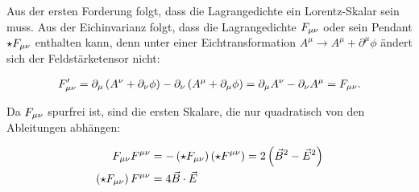 Aus der ersten Forderung folgt, dass die Lagrangedichte ein Lorentz-Skalar sein muss. Aus der Eichinvarianz folgt, dass die Lagrangedichte $F_{\mu \nu}$ oder sein Pendant $\star F_{\mu \nu}$ enthalten kann, denn unter einer Eichtransformation $A^{\mu} \rightarrow A^{\mu} + \partial^{\mu} \phi$ ändert sich der Feldstärketensor nicht:

\begin{align}
F_{\mu \nu} ' = \partial_{\mu} \left( A^{\nu} + \partial_{\nu} \phi \right) - \partial_{\nu} \left( A^{\mu} + \partial_{\mu} \phi \right) = \partial_{\mu}  A^{\nu} - \partial_{\nu} A^{\mu} = F_{\mu \nu}.
\end{align}

Da $F_{\mu \nu}$ spurfrei ist, sind die ersten Skalare, die nur quadratisch von den Ableitungen abhängen:

\begin{align}
F_{\mu \nu} F^{\mu \nu} &= - \left( \star F_{\mu \nu} \right) \left( \star F^{\mu \nu} \right) = 2 \left( \vec{B}^2 - \vec{E}^2 \right) \\
\left( \star F_{\mu \nu} \right) F^{\mu \nu} &= 4 \vec{B} \cdot \vec{E}
\end{align}

